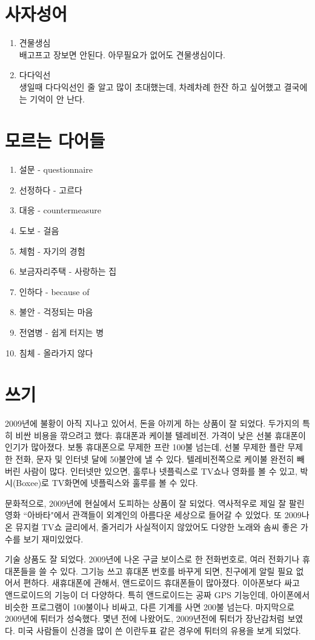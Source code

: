\documentclass[11pt]{article}
\begin{document}
\section{사자성어}
\begin{enumerate}
  \item 견물생심 \\
배고프고 장보면 안된다. 아무필요가 없어도 견물생심이다.

  \item 다다익선 \\
생일때 다다익선인 줄 알고 많이 초대했는데, 차례차례 한잔 하고 싶어했고 결국에는 기억이 안 난다.
\end{enumerate}

\section{모르는 다어들}
\begin{enumerate}
  \item 설문 - questionnaire
  \item 선정하다 - 고르다
  \item 대응 - countermeasure
  \item 도보 - 걸음
  \item 체험 - 자기의 경험
  \item 보금자리주택 - 사랑하는 집
  \item 인하다 - because of
  \item 불안 - 걱정되는 마음
  \item 전염병 - 쉽게 터지는 병
  \item 침체 - 올라가지 않다
\end{enumerate}

\section{쓰기}
\doublespacing

2009년에 불황이 아직 지나고 있어서, 돈을 아끼게 하는 상품이 잘 되었다. 두가지의 특히 비싼 비용을 깎으려고 했다: 휴대폰과 케이블 텔레비전.  가격이 낮은 선불 휴대폰이 인기가 많아졌다. 보통 휴대폰으로 무제한 프란 100불 넘는데, 선불 무제한 플란 무제한 전화, 문자 및 인터넷 달에 50불안에 낼 수 있다.  텔레비전쪽으로 케이불 완전히 빼버린 사람이 많다.  인터넷만 있으면, 훌루나 넷플릭스로 TV쇼나 영화를 볼 수 있고, 박시(Boxee)로 TV화면에 넷플릭스와 훌루를 볼 수 있다.

문화적으로, 2009년에 현실에서 도피하는 상품이 잘 되었다. 역사적우로 제일 잘 팔린 영화 ``아바타"에서 관객들이 외계인의 아름다운 세상으로 들어갈 수 있었다.  또 2009나온 뮤지컬 TV쇼 글리에서, 줄거리가 사실적이지 않았어도 다양한 노래와 솜씨 좋은 가수를 보기 재미있었다.

기술 상품도 잘 되었다. 2009년에 나온 구글 보이스로 한 전화번호로, 여러 전화기나 휴대폰들을 쓸 수 있다. 그기능 쓰고 휴대폰 번호를  바꾸게 되면, 친구에게 알릴 필요 없어서 편하다.  새휴대폰에 관해서, 앤드로이드 휴대폰들이 많아졌다.  이아폰보다 싸고 앤드로이드의 기능이 더 다양하다. 특히 앤드로이드는 공짜 GPS 기능인데, 아이폰에서 비슷한 프로그램이 100불이나 비싸고, 다른 기계를 사면 200불 넘는다.  마지막으로 2009년에 튀터가 성숙했다. 몇년 전에 나왔어도, 2009년전에 튀터가 장난감처럼 보였다. 미국 사람들이 신경을 많이 쓴 이란두표 같은 경우에 튀터의 유용을 보게 되었다.
\end{document}
